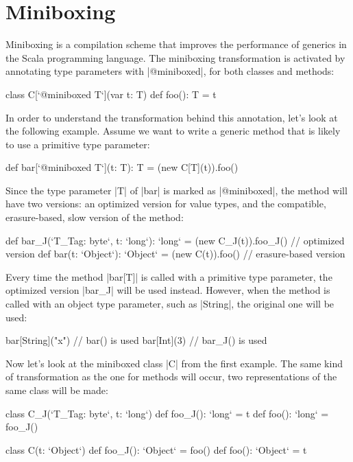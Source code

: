 \section{Miniboxing}

Miniboxing\cite{miniboxing-www} is a compilation scheme that improves the performance of generics in the Scala programming language. The miniboxing transformation is activated by annotating type parameters with |@miniboxed|, for both classes and methods:

\begin{lstlisting-nobreak}
class C[`@miniboxed T`](var t: T) {
  def foo(): T = t
}
\end{lstlisting-nobreak}

In order to understand the transformation behind this annotation, let's look at the following example. Assume we want to write a generic method that is likely to use a primitive type parameter:

\begin{lstlisting-nobreak}
def bar[`@miniboxed T`](t: T): T =
  (new C[T](t)).foo()
\end{lstlisting-nobreak}

Since the type parameter |T| of |bar| is marked as |@miniboxed|, the method will have two versions: an optimized version for value types, and the compatible, erasure-based, slow version of the method:

\begin{lstlisting-nobreak}
def bar_J(`T_Tag: byte`, t: `long`): `long` =
  (new C_J(t)).foo_J()   // optimized version
def bar(t: `Object`): `Object` =
  (new C(t)).foo()   // erasure-based version
\end{lstlisting-nobreak}

Every time the method |bar[T]| is called with a primitive type parameter, the optimized version |bar_J| will be used instead. However, when the method is called with an object type parameter, such as |String|, the original one will be used:

\begin{lstlisting-nobreak}
bar[String]("x")  // bar() is used
bar[Int](3)           // bar_J() is used
\end{lstlisting-nobreak}

Now let's look at the miniboxed class |C| from the first example. The same kind of transformation as the one for methods will occur, two representations of the same class will be made:

\begin{lstlisting-nobreak}
class C_J(`T_Tag: byte`, t: `long`) {
  def foo_J(): `long` = t
  def foo(): `long` = foo_J()
}

class C(t: `Object`) {
  def foo_J(): `Object` = foo()
  def foo(): `Object` = t
}
\end{lstlisting-nobreak}

